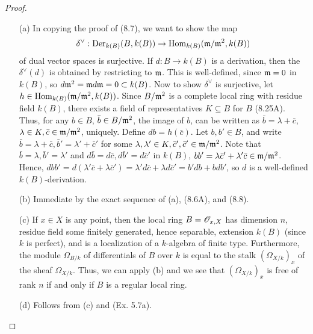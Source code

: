 \documentclass{article}
\begin{document}
\begin{enumerate} [label=\textbf{\arabic*.}, leftmargin=0em]
\begin{proof} $ $ \vspace{0pt}
\begin{itemize} [leftmargin=0cm]
\item[(a)] In copying the proof of (8.7), we want to show the map
\begin{equation*}
    \delta^\vee : \operatorname{Der}_{k(B)}(B, k(B)) \to \operatorname{Hom}_{k(B)}(\mathfrak{m}/\mathfrak{m}^2, k(B))
\end{equation*}
of dual vector spaces is surjective.
If $d : B \to k(B)$ is a derivation, then the $\delta^\vee(d)$ is obtained by restricting to $\mathfrak{m}$.
This is well-defined, since $\mathfrak{m} = 0$ in $k(B)$, so $d\mathfrak{m}^2 = \mathfrak{m} d\mathfrak{m} = 0 \subset k(B)$.
Now to show $\delta^\vee$ is surjective, let $h \in \operatorname{Hom}_{k(B)}(\mathfrak{m}/\mathfrak{m}^2, k(B))$. Since $B / \mathfrak{m}^2$ is a complete local ring with residue field $k(B)$, there exists a field of representatives $K \subseteq B$ for $B$ (8.25A).
Thus, for any $b \in B$, $\bar{b} \in B / \mathfrak{m}^2$, the image of $b$, can be written as $\bar{b} = \lambda + \bar{c}$, $\lambda \in K, \bar{c} \in \mathfrak{m}/\mathfrak{m}^2$, uniquely.
Define $db = h(\bar{c})$.
Let $b, b' \in B$, and write $\bar{b} = \lambda + \bar{c}, \bar{b}' = \lambda' + \bar{c}'$ for some $\lambda, \lambda' \in K, \bar{c}', \bar{c}' \in \mathfrak{m}/\mathfrak{m}^2$.
Note that $\bar{b} = \lambda, \bar{b}' = \lambda'$ and $d\bar{b} = d\bar{c}, d\bar{b}' = d\bar{c}'$ in $k(B)$, $bb' = \lambda \bar{c}' + \lambda' \bar{c} \in \mathfrak{m}/\mathfrak{m}^2$.
Hence, $dbb' = d(\lambda' \bar{c} + \lambda \bar{c}') = \lambda' d\bar{c} + \lambda d\bar{c}' = b'db + bdb'$, so $d$ is a well-defined $k(B)$-derivation.

\item[(b)] Immediate by the exact sequence of (a), (8.6A), and (8.8).

\item[(c)] If $x \in X$ is any point, then the local ring $B = \mathscr{O}_{x, X}$ has dimension $n$, residue field some finitely generated, hence separable, extension $k(B)$ (since $k$ is perfect), and is a localization of a $k$-algebra of finite type.
Furthermore, the module $\Omega_{B/k}$ of differentials of $B$ over $k$ is equal to the stalk $(\Omega_{X/k})_x$ of the sheaf $\Omega_{X/k}$.
Thus, we can apply (b) and we see that $(\Omega_{X/k})_x$ is free of rank $n$ if and only if $B$ is a regular local ring.

\item[(d)] Follows from (c) and (Ex. 5.7a).

\end{itemize} 
\end{proof}


\end{enumerate}
\end{document}
